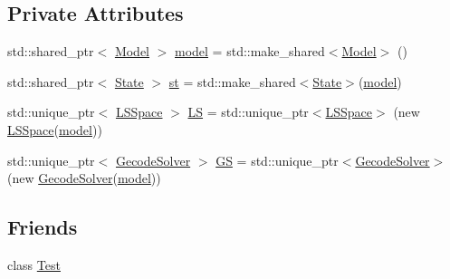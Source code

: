 \subsection*{Private Attributes}
\begin{DoxyCompactItemize}
\item 
std\-::shared\-\_\-ptr$<$ \hyperlink{class_model}{Model} $>$ \hyperlink{class_general_solver_a83831a1f3765851d544a8badccab3178}{model} = std\-::make\-\_\-shared$<$\hyperlink{class_model}{Model}$>$ ()
\item 
std\-::shared\-\_\-ptr$<$ \hyperlink{class_state}{State} $>$ \hyperlink{class_general_solver_aa8f7806985c11c39b355f0720764ce66}{st} = std\-::make\-\_\-shared$<$\hyperlink{class_state}{State}$>$(\hyperlink{class_general_solver_a83831a1f3765851d544a8badccab3178}{model})
\item 
std\-::unique\-\_\-ptr$<$ \hyperlink{class_l_s_space}{L\-S\-Space} $>$ \hyperlink{class_general_solver_ad70adfee5b2c8779c975d91cb24efcc5}{L\-S} = std\-::unique\-\_\-ptr$<$\hyperlink{class_l_s_space}{L\-S\-Space}$>$ (new \hyperlink{class_l_s_space}{L\-S\-Space}(\hyperlink{class_general_solver_a83831a1f3765851d544a8badccab3178}{model}))
\item 
std\-::unique\-\_\-ptr$<$ \hyperlink{class_gecode_solver}{Gecode\-Solver} $>$ \hyperlink{class_general_solver_a7edfe7eb7a5b8c492e2aa4b697959a3e}{G\-S} = std\-::unique\-\_\-ptr$<$\hyperlink{class_gecode_solver}{Gecode\-Solver}$>$ (new \hyperlink{class_gecode_solver}{Gecode\-Solver}(\hyperlink{class_general_solver_a83831a1f3765851d544a8badccab3178}{model}))
\end{DoxyCompactItemize}
\subsection*{Friends}
\begin{DoxyCompactItemize}
\item 
class \hyperlink{class_general_solver_a5b78b1c2e1fa07ffed92da365593eaa4}{Test}
\end{DoxyCompactItemize}


